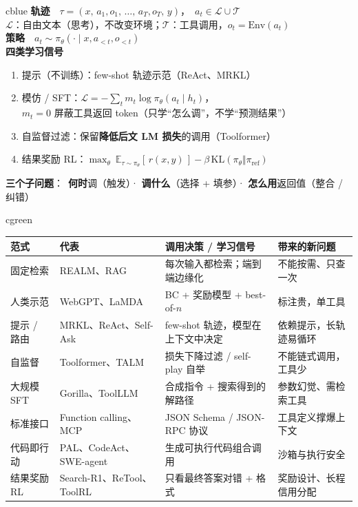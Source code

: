 \documentclass[8pt]{extarticle}
\begin{document}
\begin{minipage}[t]{0.37\linewidth}\vspace{0pt}
\begin{tbox}[title={统一形式化：tool use = 部分可观测的序列决策}]{cblue}
\small
\textbf{轨迹}\ \ $\tau=(x,\,a_1,o_1,\,\dots,\,a_T,o_T,\,y)$，\ $a_t\in\mathcal{L}\cup\mathcal{T}$\\
$\mathcal{L}$：自由文本（思考），不改变环境；$\mathcal{T}$：工具调用，$o_t=\mathrm{Env}(a_t)$\\
\textbf{策略}\ \ $a_t\sim\pi_\theta(\cdot\mid x,a_{<t},o_{<t})$\\[2pt]
\textbf{四类学习信号}
\begin{enumerate}
\item 提示（不训练）：few-shot 轨迹示范（ReAct、MRKL）
\item 模仿 / SFT：$\mathcal{L}=-\sum_t m_t\log\pi_\theta(a_t\mid h_t)$，\\$m_t=0$ 屏蔽工具返回 token（只学“怎么调”，不学“预测结果”）
\item 自监督过滤：保留\textbf{降低后文 LM 损失}的调用（Toolformer）
\item 结果奖励 RL：$\max_\theta\ \mathbb{E}_{\tau\sim\pi_\theta}[\,r(x,y)\,]-\beta\,\mathrm{KL}(\pi_\theta\Vert\pi_{\mathrm{ref}})$
\end{enumerate}
\textbf{三个子问题}：\ \textbf{何时}调（触发）· \textbf{调什么}（选择 + 填参）· \textbf{怎么用}返回值（整合 / 纠错）
\end{tbox}
\end{minipage}\hfill
\begin{minipage}[t]{0.615\linewidth}\vspace{0pt}
\begin{tbox}[title={范式对照：每一代由谁决定调用、靠什么学会}]{cgreen}
\small
\begin{tabularx}{\linewidth}{@{}p{1.55cm} p{2.6cm} p{3.4cm} Y@{}}
\toprule
范式 & 代表 & 调用决策 / 学习信号 & 带来的新问题\\\midrule
{\color{cblue}固定检索} & REALM、RAG & 每次输入都检索；端到端边缘化 & 不能按需、只查一次\\
{\color{cblue}人类示范} & WebGPT、LaMDA & BC + 奖励模型 + best-of-$n$ & 标注贵，单工具\\
{\color{cblue}提示 / 路由} & MRKL、ReAct、Self-Ask & few-shot 轨迹，模型在上下文中决定 & 依赖提示，长轨迹易循环\\
{\color{cblue}自监督} & Toolformer、TALM & 损失下降过滤 / self-play 自举 & 不能链式调用，工具少\\
{\color{cblue}大规模 SFT} & Gorilla、ToolLLM & 合成指令 + 搜索得到的解路径 & 参数幻觉、需检索工具\\
{\color{cblue}标准接口} & Function calling、MCP & JSON Schema / JSON-RPC 协议 & 工具定义撑爆上下文\\
{\color{cblue}代码即行动} & PAL、CodeAct、SWE-agent & 生成可执行代码组合调用 & 沙箱与执行安全\\
{\color{cred}结果奖励 RL} & Search-R1、ReTool、ToolRL & 只看最终答案对错 + 格式 & 奖励设计、长程信用分配\\
\bottomrule
\end{tabularx}
\end{tbox}
\end{minipage}
\end{document}
